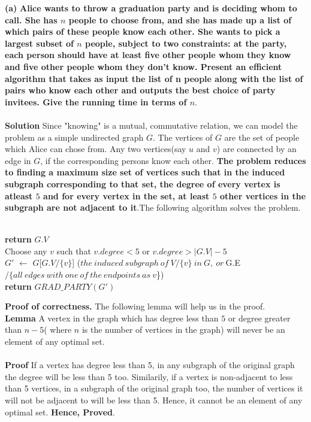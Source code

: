 \documentclass[a4paper]{article}
\begin{document}
\textbf{(a)} \textbf{Alice wants to throw a graduation party and is deciding whom to call. She has $n$ people to choose from, and she has made up a list of which pairs of these people know each other. She wants to pick a largest subset of $n$ people, subject to two constraints: at the party, each person should have at least five other people whom they know and five other people whom they don’t know. Present an efficient algorithm that takes as input the list of n people along with the list of pairs who know each other and outputs the best choice of party invitees. Give the running time in terms of $n$}. \\
\\
\textbf{Solution} Since "knowing" is a mutual, commutative relation, we can model the problem as a simple undirected graph $G$. The vertices of $G$ are the set of people which Alice can chose from. Any two vertices(say $u$ and $v$) are connected by an edge in $G$, if the corresponding persons know each other. \textbf{The problem reduces to finding a maximum size set of vertices such that in the induced subgraph corresponding to that set, the degree of every vertex is atleast $5$ and for every vertex in the set, at least $5$ other vertices in the subgraph are not adjacent to it}.The following algorithm solves the problem.\\
\begin{algorithm}[H]
\caption {$GRAD\_PARTY(G)$}
\begin{algorithmic}
 \\
\textbf{return} $G.V$ 
\Else \\
Choose any $v$ such that $v.degree < 5$ or $v.degree > |G.V| - 5$ \\
$G'$ $\gets$ $G$[$G.V/\{v\}$] ($the\ induced\ subgraph\ of\ V/\{v\}\ in\ G,\ or\  $G.E$/\{all\  edges\ with\ one\ of\ the\ endpoints\ as\ v$\})\\ 
\textbf{return} $GRAD\_PARTY(G')$
\EndIf
\end{algorithmic}
\end{algorithm}
\textbf{Proof of correctness.} The following lemma will help us in the proof. \\
\textbf{Lemma} A vertex in the graph which has degree less than $5$ or degree greater than $n-5$( where $n$ is the number of vertices in the graph) will never be an element of any optimal set.\\
\\
\textbf{Proof} If a vertex has degree less than 5, in any subgraph of the original graph the degree will be less than 5 too. Similarily, if a vertex is non-adjacent to less than 5 vertices, in a subgraph of the original graph too, the number of vertices it will not be adjacent to will be less than 5. Hence, it cannot be an element of any optimal set. \textbf{Hence, Proved}. \\
\end{document}
